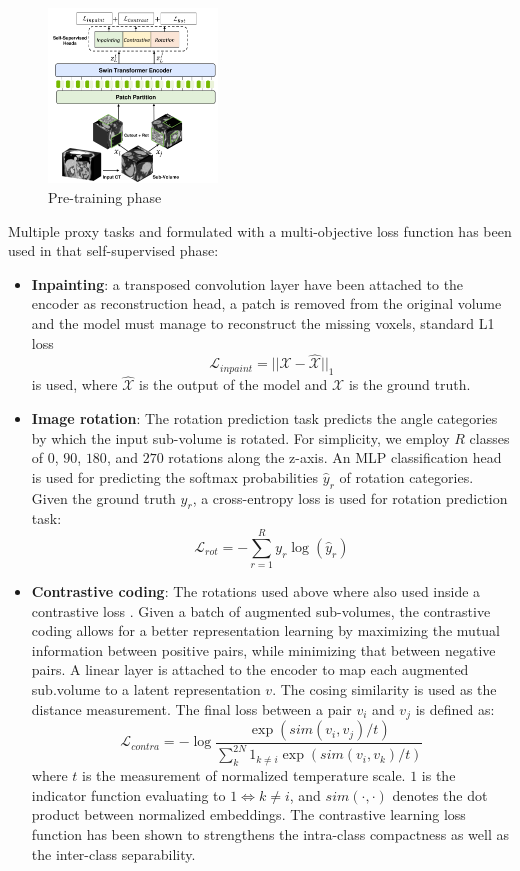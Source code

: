 \begin{figure}[ht!]
  \centering
  \includegraphics[width=0.4\textwidth]{Images/pretrain-unetr.png}
  \caption{Pre-training phase}
  \label{fig:pretrain-unetr}
\end{figure}
Multiple proxy tasks and formulated with a multi-objective loss function has
been used in that self-supervised phase:
\begin{itemize}
  \item{\textbf{Inpainting}: a transposed convolution layer have been attached
    to the encoder as reconstruction head, a patch is removed from the original
    volume and the model must manage to reconstruct the missing voxels, standard
    L1 loss $$\mathcal{L}_{inpaint} = ||\mathcal{X} - \hat{\mathcal{X}}||_1$$ is
    used, where $\hat{\mathcal{X}}$ is the output of the model and $\mathcal{X}$
    is the ground truth.}
  \item{\textbf{Image rotation}: The rotation prediction task predicts the angle
    categories by which the input sub-volume is rotated. For simplicity, we
    employ $R$ classes of $0$, $90$, $180$, and $270$ rotations along the
    z-axis. An MLP classification head is used for predicting the softmax
    probabilities $\hat{y}_r$ of rotation categories. Given the ground truth
    $y_r$, a cross-entropy loss is used for rotation prediction task:
    $$\mathcal{L}_{rot} = -\sum^R_{r=1}y_r\log(\hat{y}_r)$$}
  \item{\textbf{Contrastive coding}: The rotations used above where also used
    inside a contrastive loss \cite{oord2018representation}. Given a batch of
    augmented sub-volumes, the contrastive coding allows for a better
    representation learning by maximizing the mutual information between
    positive pairs, while minimizing that between negative pairs. A linear layer
    is attached to the encoder to map each augmented sub.volume to a latent
    representation $v$. The cosing similarity is used as the distance
    measurement. The final loss between a pair $v_i$ and $v_j$ is defined as:
    $$\mathcal{L}_{contra} = -\log{\frac{\exp{(sim(v_i,v_j)/t)}}{\sum_k^{2N}1_{k
    \neq i}\exp{(sim(v_i,v_k)/t)}}}$$
    where $t$ is the measurement of normalized temperature scale. $1$ is the
    indicator function evaluating to $1 \iff k \neq i$, and $sim(\cdot, \cdot)$
    denotes the dot product between normalized embeddings.
    The contrastive learning loss function has been shown to strengthens the
    intra-class compactness as well as the inter-class separability.}
\end{itemize}

